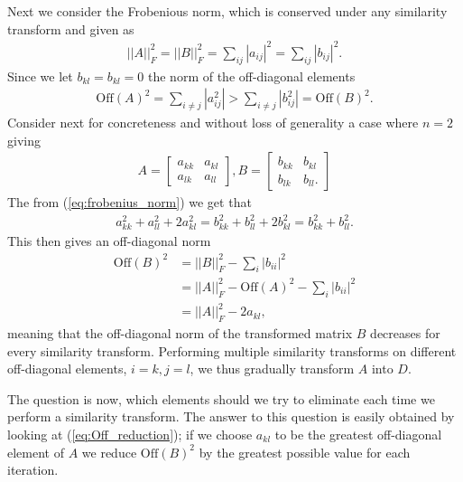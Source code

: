 \documentclass[twocolumn]{aastex62}
\begin{document}
Next we consider the Frobenious norm, which is conserved under any similarity transform and given as 
\begin{align}
	||A||_F^2 = ||B||_F^2 = \sum_{ij}|a_{ij}|^2 = \sum_{ij}|b_{ij}|^2.
	\label{eq:frobenius_norm}
\end{align}
Since we let $b_{kl} = b_{kl} = 0$ the norm of the off-diagonal elements 
\begin{align}
	\text{Off}(A)^2 = \sum_{i\neq j} |a_{ij}^2| > \sum_{i\neq j} |b_{ij}^2| = \text{Off}(B)^2.
\end{align}
Consider next for concreteness and without loss of generality a case where $n=2$ giving 
\begin{align}
	A = 	
	\begin{bmatrix}
		a_{kk} & a_{kl}\\
		a_{lk} & a_{ll}
	\end{bmatrix},
	B = 
	\begin{bmatrix}
		b_{kk} & b_{kl}\\
		b_{lk} & b_{ll}.
	\end{bmatrix}
\end{align}
The from (\ref{eq:frobenius_norm}) we get that 
\begin{align}
	a_{kk}^2 + a_{ll}^2 + 2a_{kl}^2 = b_{kk}^2 + b_{ll}^2 + 2b_{kl}^2 = 		b_{kk}^2 + b_{ll}^2.
	\label{eq:frobenius_norm_n2}
\end{align} 
This then gives an off-diagonal norm 
\begin{align}
	\text{Off}(B)^2 &= ||B||_F^2 - \sum_i |b_{ii}|^2 \\
	&= ||A||_F^2 - \text{Off}(A)^2 - \sum_i |b_{ii}|^2 \\
	&= ||A||_F^2 - 2a_{kl},
	\label{eq:Off_reduction}
\end{align}
meaning that the off-diagonal norm of the transformed matrix $B$ decreases for every similarity transform. Performing multiple similarity transforms on different off-diagonal elements, $i = k, j = l$, we thus gradually transform $A$ into $D$.  

The question is now, which elements should we try to eliminate each time we perform a similarity transform. The answer to this question is easily obtained by looking at (\ref{eq:Off_reduction}); if we choose $a_{kl}$ to be the greatest off-diagonal element of $A$ we reduce $\text{Off}(B)^2$ by the greatest possible value for each iteration. 
\end{document}
